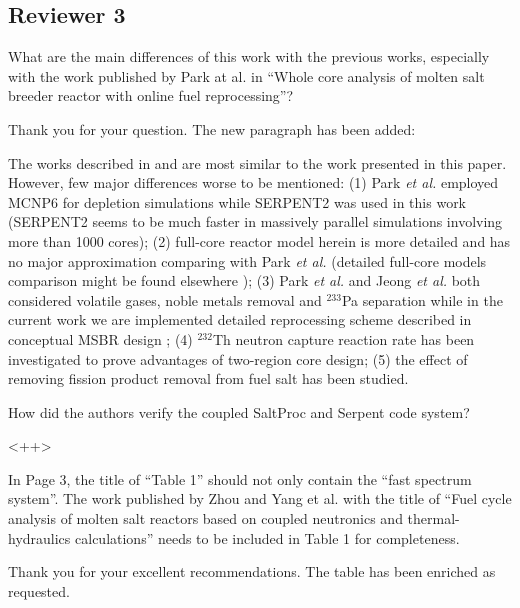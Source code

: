 \documentclass[answers,11pt]{exam}
\begin{document}
\begin{questions}
        \section*{Reviewer 3}


        \question  What are the main differences of this work with the previous 
        works, especially with the work published by Park at al. in ``Whole core 
        analysis of molten salt breeder reactor with online fuel reprocessing''?
        \begin{solution}
                Thank you for your question. The new paragraph has been added:
                
                The works described in \cite{park_whole_2015} and 
                \cite{jeong_equilibrium_2016} are most similar to the work 
                presented in this paper. However, few major differences worse to 
                be mentioned: (1) Park \emph{et al.} employed MCNP6 for depletion 
				simulations while SERPENT2 was used in this work (SERPENT2 seems 
				to be much faster in massively parallel simulations involving more 
				than 1000 cores); (2) full-core reactor model herein is more 
				detailed and has no major approximation comparing with Park \emph{et al.}
				(detailed full-core models comparison might be found elsewhere
				\cite{rykhlevskii_full-core_2017}); (3) Park \emph{et al.} and 
				Jeong \emph{et al.} both considered volatile gases, noble metals 
				removal and $^{233}$Pa separation while in the current work we are 
				implemented detailed reprocessing scheme described in conceptual 
				MSBR design \cite{robertson_conceptual_1971}; (4) $^{232}$Th 
				neutron capture reaction rate has been investigated to prove 
				advantages of two-region core design; (5) the effect of removing 
				fission product removal from fuel salt has been studied. 
        \end{solution}

        \question  How did the authors verify the coupled SaltProc and Serpent 
        code system?  \begin{solution}
                <++>
        \end{solution}

        \question  In Page 3, the title of ``Table 1'' should not only contain 
        the ``fast spectrum system''. The work published by Zhou and Yang et al. 
        with the title of ``Fuel cycle analysis of molten salt reactors based on 
        coupled neutronics and thermal-hydraulics calculations'' needs to be 
        included in Table 1 for completeness.
        \begin{solution}
                Thank you for your excellent recommendations. The table has been 
                enriched as requested.
        \end{solution}


\end{questions}
\end{document}
